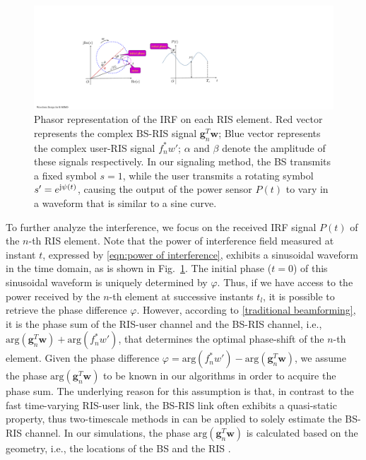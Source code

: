 \documentclass[journal,twocolumn]{IEEEtran}
\theoremstyle{nonumberplain}
\def \arg {\text{arg}}
\begin{document}
    \begin{figure}[!t]
        \centering
        \includegraphics[width=\linewidth]{figures/phasor.pdf}
        \caption{Phasor representation of the \ac{IRF} on each RIS element. Red vector represents the complex BS-RIS signal ${\bm g}_n^T{\bm w}$; Blue vector represents the complex user-RIS signal $f_n^*w'$; $\alpha$ and $\beta$ denote the amplitude of these signals respectively. In our signaling method, the BS transmits a fixed symbol $s=1$, while the user transmits a rotating symbol $s'=e^{{\rm j}\psi(t)}$, causing the output of the power sensor $P(t)$ to vary in a waveform that is similar to a sine curve.}
        \label{fig:phasor}
    \end{figure}
    To further analyze the interference, we focus on the received IRF signal $P(t)$ of the $n$-th RIS element. 
    Note that the power of interference field measured at instant $t$, expressed by \eqref{eqn:power of interference}, exhibits a sinusoidal waveform in the time domain, as is shown in Fig.~\ref{fig:phasor}. 
    The initial phase ($t=0$) of this sinusoidal waveform is uniquely determined by $\varphi$.
    Thus, if we have access to the power received by the $n$-th element at successive instants $t_l$, it is possible to retrieve the phase difference $\varphi$. 
    However, according to \eqref{traditional beamforming}, it is the phase sum of the RIS-user channel and the BS-RIS channel, i.e., $\arg({\bm g}_n^{T}{\bm w})+\arg(f_n^*w')$, that determines the optimal phase-shift of the $n$-th element. Given the phase difference $\varphi = \arg\left(f_{n}^{*}w'\right)-\arg\left(\bm g_{n}^{T}\bm w\right)$, we assume the phase $\arg({\bm g}_n^{T}{\bm w})$ to be known in our algorithms in order to acquire the phase sum.
    The underlying reason for this assumption is that, in contrast to the fast time-varying RIS-user link, the BS-RIS link often exhibits a quasi-static property, thus two-timescale methods in \cite{Huchen} can be applied to solely estimate the BS-RIS channel.
    In our simulations, the phase $\arg({\bm g}_n^{T}{\bm w})$ is calculated based on the geometry, i.e., the locations of the BS and the RIS \cite{bai2014coverage}. 
\end{document}
